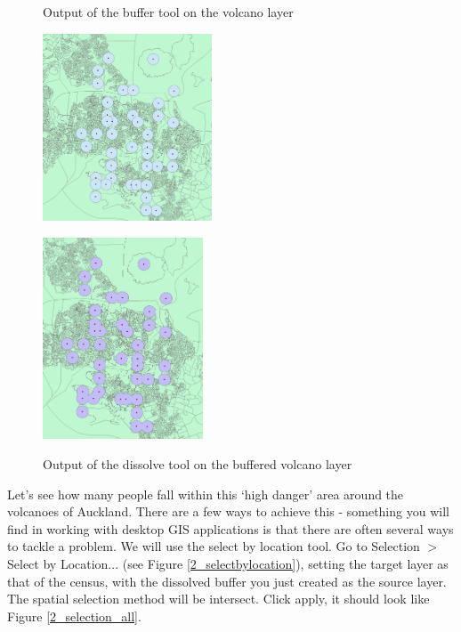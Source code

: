\documentclass{article}
\begin{document}
\begin{figure}[h]
  \centering
  \begin{minipage}[b]{0.4\textwidth}
    \centering
    \caption{Output of the buffer tool on the volcano layer}
    \includegraphics[width=190px]{images/part2/volcano_buffer_output.PNG}
    \label{2_buffer_output}
  \end{minipage}
  \hfill
  \begin{minipage}[b]{0.4\textwidth}
    \centering
    \caption{Output of the dissolve tool on the buffered volcano layer}
    \includegraphics[width=180px]{images/part2/volcano_buffer_dissolved_output.PNG}
    \label{2_dissolved_output}
  \end{minipage}
\end{figure}

Let's see how many people fall within this `high danger' area around the volcanoes of Auckland. There are a few ways to achieve this - something you will find in working with desktop GIS applications is that there are often several ways to tackle a problem. We will use the select by location tool. Go to Selection $>$ Select by Location... (see Figure \ref{2_selectbylocation}), setting the target layer as that of the census, with the dissolved buffer you just created as the source layer. The spatial selection method will be intersect. Click apply, it should look like Figure \ref{2_selection_all}. 
\end{document}
